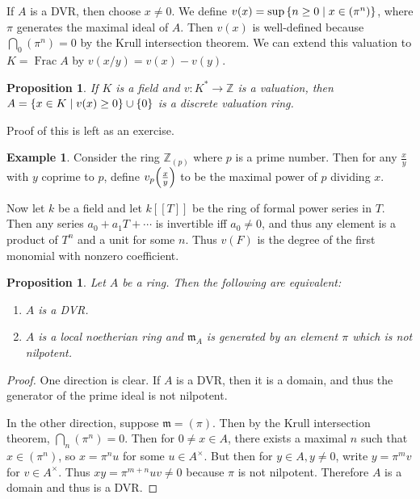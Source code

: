 \documentclass[leqno, openany]{memoir}
\newtheorem{prop}[thm]{Proposition}
\theoremstyle{definition}
\newtheorem{exm}[thm]{Example}
\theoremstyle{remark}
\theoremstyle{plain}
\theoremstyle{definition}
\theoremstyle{remark}
\newcommand{\Z}{\mathbb{Z}}
\newcommand{\mf}[1]{\mathfrak{#1}}
\begin{document}
If $A$ is a DVR, then choose $x \neq 0$. We define $v(x) = \sup \qty{n \geq 0 \mid x \in (\pi^n)}$, where $\pi$ generates the maximal ideal of $A$. Then $v(x)$ is well-defined because $\bigcap_0 (\pi^n) = 0$ by the Krull intersection theorem. We can extend this valuation to $K = \operatorname{Frac} A$ by $v(x/y) = v(x) - v(y)$. 

\begin{prop}
    If $K$ is a field and $v \colon K^* \to \Z$ is a valuation, then $A = \qty{x \in K \mid v(x) \geq 0} \cup \qty{0}$ is a discrete valuation ring.
\end{prop}

Proof of this is left as an exercise.

\begin{exm}
    Consider the ring $\Z_{(p)}$ where $p$ is a prime number. Then for any $\frac{x}{y}$ with $y$ coprime to $p$, define $v_p\qty(\frac{x}{y})$ to be the maximal power of $p$ dividing $x$.

    Now let $k$ be a field and let $k[[T]]$ be the ring of formal power series in $T$. Then any series $a_0 + a_1 T + \cdots$ is invertible iff $a_0 \neq 0$, and thus any element is a product of $T^n$ and a unit for some $n$. Thus $v(F)$ is the degree of the first monomial with nonzero coefficient.
\end{exm}

\begin{prop}
    Let $A$ be a ring. Then the following are equivalent:
    \begin{enumerate}
        \item $A$ is a DVR.
        \item $A$ is a local noetherian ring and $\mf{m}_A$ is generated by an element $\pi$ which is not nilpotent.
    \end{enumerate}
\end{prop}

\begin{proof}
    One direction is clear. If $A$ is a DVR, then it is a domain, and thus the generator of the prime ideal is not nilpotent.

    In the other direction, suppose $\mf{m} = (\pi)$. Then by the Krull intersection theorem, $\bigcap_n (\pi^n) = 0$. Then for $0 \neq x \in A$, there exists a maximal $n$ such that $x \in (\pi^n)$, so $x = \pi^n u$ for some $u \in A^{\times}$. But then for $y \in A, y \neq 0$, write $y = \pi^m v$ for $v \in A^{\times}$. Thus $xy = \pi^{m+n} uv \neq 0$ because $\pi$ is not nilpotent. Therefore $A$ is a domain and thus is a DVR.
\end{proof}
\end{document}
